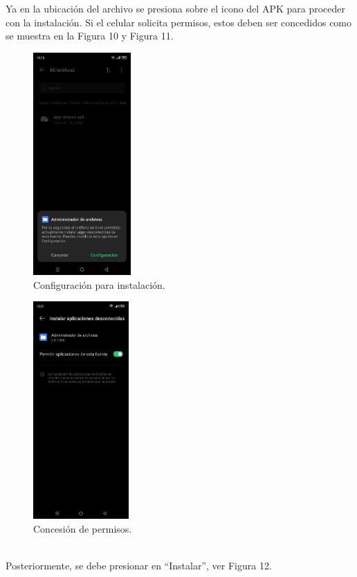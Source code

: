 \documentclass[a4paper,10pt, oneside, titlepage]{article}
\begin{document}
	Ya en la ubicación del archivo se presiona sobre el icono del APK para proceder con la instalación. Si el celular solicita permisos, estos deben ser concedidos como se muestra en la Figura 10 y Figura 11.
	\begin{figure}[!h]
		\centering
		\includegraphics[width = 0.45\linewidth, height = 8.5cm]{10.jpeg}
		\caption{Configuración para instalación.}
	\end{figure}
	\begin{figure}[!h]
		\centering
		\includegraphics[width = 0.45\linewidth, height = 8.3cm]{11.jpeg}
		\caption{Concesión de permisos.}
	\end{figure}\\
	Posteriormente, se debe presionar en ``Instalar'', ver Figura 12.
\end{document}
